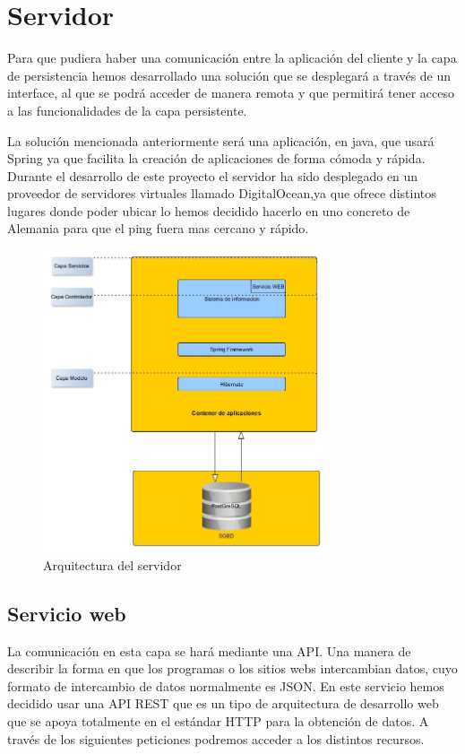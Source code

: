 \section{Servidor}
Para que pudiera haber una comunicación entre la aplicación del cliente y la capa de persistencia hemos desarrollado una solución que se desplegará a través de un interface, al que se podrá acceder de manera remota y que permitirá tener acceso a las funcionalidades de la capa persistente.

La solución mencionada anteriormente será una aplicación, en java, que  usará Spring ya que facilita la creación de aplicaciones de forma cómoda y rápida.\\

Durante el desarrollo  de este proyecto el servidor ha sido desplegado en un proveedor de servidores virtuales llamado 
  DigitalOcean,ya que ofrece distintos lugares donde poder ubicar lo hemos decidido hacerlo en uno concreto de Alemania para que el ping fuera mas cercano y rápido.
\begin{figure}[H]
		\centering
		\includegraphics[width=0.75\textwidth] {arquitectura-servidor.jpg}
		\caption{Arquitectura del servidor }
	\end{figure}


\subsection{Servicio web}
 La comunicación en esta capa se hará mediante una API. Una manera de describir la forma en que los programas o los sitios webs intercambian datos, cuyo formato  de intercambio de datos normalmente es JSON. En este servicio hemos decidido usar una API REST que es un tipo de arquitectura de desarrollo web que se apoya totalmente en el estándar HTTP para la obtención de datos. A través de los siguientes peticiones podremos acceder a los distintos recursos.
 

